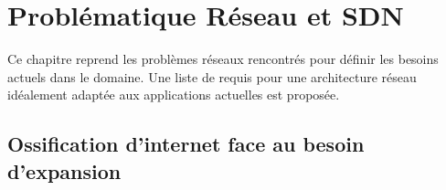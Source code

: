 \chapter{Problématique Réseau et SDN}
\label{chap-1}



Ce chapitre reprend les problèmes réseaux rencontrés pour définir les besoins actuels dans le domaine. 
Une liste de requis pour une architecture réseau idéalement adaptée aux applications actuelles est proposée.


\section{Ossification d'internet face au besoin d'expansion}








